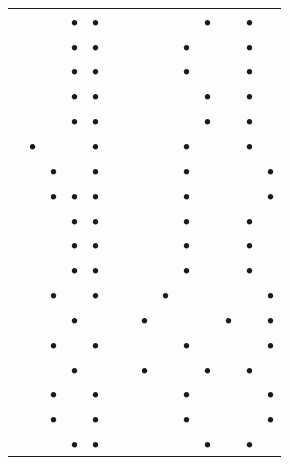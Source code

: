 \documentclass[11pt,3p]{elsarticle}
\begin{document}
\begin{table}[!htbp]
{\begin{tabular}{lccccccccccccc}
\citet{kim2017integrated} &  &  & $\bullet$ & $\bullet$ &  &  &  &  &  & $\bullet$ &  & $\bullet$ &  \\
\citet{moreno2017towards} &  &  & $\bullet$ & $\bullet$ &  &  &  &  & $\bullet$ &  &  & $\bullet$ &  \\
\citet{nunes2015design} &  &  & $\bullet$ & $\bullet$ &  &  &  &  & $\bullet$ &  &  & $\bullet$ &  \\
\citet{ogumerem2017multi} &  &  & $\bullet$ & $\bullet$ &  &  &  &  &  & $\bullet$ &  & $\bullet$ &  \\
\citet{parker2010waste} &  &  & $\bullet$ & $\bullet$ &  &  &  &  &  & $\bullet$ &  & $\bullet$ &  \\
\citet{qadrdan2008model} & $\bullet$ &  &  & $\bullet$ &  &  &  &  & $\bullet$ &  &  & $\bullet$ &  \\
\citet{rits2004evaluating} &  & $\bullet$ &  & $\bullet$ &  &  &  &  & $\bullet$ &  &  &  & $\bullet$ \\
\citet{rosenberg2010market} &  & $\bullet$ & $\bullet$ & $\bullet$ &  &  &  &  & $\bullet$ &  &  &  & $\bullet$ \\
\citet{sabio2010strategic} &  &  & $\bullet$ & $\bullet$ &  &  &  &  & $\bullet$ &  &  & $\bullet$ &  \\
\citet{sabio2012holistic} &  &  & $\bullet$ & $\bullet$ &  &  &  &  & $\bullet$ &  &  & $\bullet$ &  \\
\citet{samsatli2016optimal} &  &  & $\bullet$ & $\bullet$ &  &  &  &  & $\bullet$ &  &  & $\bullet$ &  \\
\citet{sgobbi2016far} &  & $\bullet$ &  & $\bullet$ &  &  &  & $\bullet$ &  &  &  &  & $\bullet$ \\
\citet{stephens2010systematic} &  &  & $\bullet$ &  &  &  & $\bullet$ &  &  &  & $\bullet$ &  & $\bullet$ \\
\citet{strachan2009soft} &  & $\bullet$ &  & $\bullet$ &  &  &  &  & $\bullet$ &  &  &  & $\bullet$ \\
\citet{sun2017hydrogen} &  &  & $\bullet$ &  &  &  & $\bullet$ &  &  & $\bullet$ &  & $\bullet$ &  \\
\citet{tseng2005hydrogen} &  & $\bullet$ &  & $\bullet$ &  &  &  &  & $\bullet$ &  &  &  & $\bullet$ \\
\citet{winskel2009decarbonising} &  & $\bullet$ &  & $\bullet$ &  &  &  &  & $\bullet$ &  &  &  & $\bullet$ \\
\citet{won2017design} &  &  & $\bullet$ & $\bullet$ &  &  &  &  &  & $\bullet$ &  & $\bullet$ &  \\

\end{tabular}}
\end{table}
\end{document}
